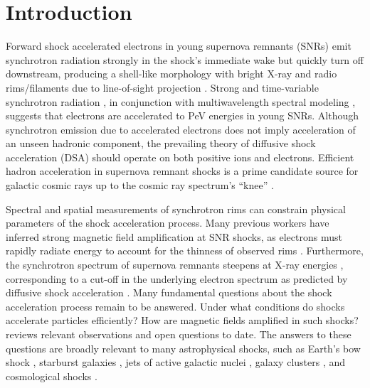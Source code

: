 \documentclass[manuscript]{aastex}  %
\begin{document}

\section{Introduction} \label{sec:intro}

Forward shock accelerated electrons in young supernova remnants (SNRs) emit
synchrotron radiation strongly in the shock's immediate wake but quickly turn
off downstream, producing a shell-like morphology with bright X-ray and radio
rims/filaments due to line-of-sight projection \citep{koyama1995}.  Strong and
time-variable synchrotron radiation \citep[e.g.,][]{uchiyama2007,
patnaude2007}, in conjunction with multiwavelength spectral modeling
\citep{aharonian2004, acero2010, ackermann2013}, suggests that electrons are
accelerated to PeV energies in young SNRs.  Although synchrotron emission due
to accelerated electrons does not imply acceleration of an unseen hadronic
component, the prevailing theory of diffusive shock acceleration (DSA) should
operate on both positive ions and electrons.  Efficient hadron acceleration in
supernova remnant shocks is a prime candidate source for galactic cosmic rays
up to the cosmic ray spectrum's ``knee'' \citep{vink2012}.

Spectral and spatial measurements of synchrotron rims can constrain physical
parameters of the shock acceleration process.  Many previous workers have
inferred strong magnetic field amplification at SNR shocks, as electrons must
rapidly radiate energy to account for the thinness of observed rims
\citep{bamba2003, vink2003, parizot2006}.  Furthermore, the synchrotron
spectrum of supernova remnants steepens at X-ray energies \citep{reynolds1999},
corresponding to a cut-off in the underlying electron spectrum as predicted by
diffusive shock acceleration \citep{webb1984}.  Many fundamental questions
about the shock acceleration process remain to be answered.  Under what
conditions do shocks accelerate particles efficiently?  How are magnetic fields
amplified in such shocks?  \citet{reynolds2008} reviews relevant observations
and open questions to date.  The answers to these questions are broadly
relevant to many astrophysical shocks, such as Earth's bow shock
\citep{ellison1990}, starburst galaxies \citep{heckman1990}, jets of active
galactic nuclei \citep{chen2014}, galaxy clusters \citep{van-weeren2010}, and
cosmological shocks \citep{ryu2008}.
\end{document}

